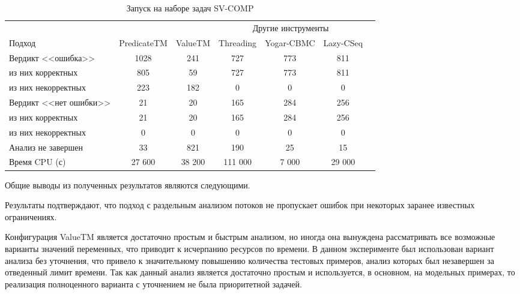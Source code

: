 \begin{center}
  \begin{table}[h]\footnotesize \centering
  	\label{table-sv-comp-tools}
    \caption{Запуск на наборе задач SV-COMP}
    \begin{tabular}{ | l | c | c | c | c | c | c |}
      \hline
      		& 		\multicolumn{2}{c|}{\theory} & \multicolumn{3}{c|}{Другие инструменты}  \\
      Подход         				& PredicateTM   & ValueTM 	& Threading & Yogar-CBMC 	& Lazy-CSeq  \\ \hline
      Вердикт <<ошибка>> 				& 1028    		& 241       & 727      	& 773       	& 811       \\ 
  \hspace{0.5cm} из них корректных 	& 805 			& 59 		& 727      	& 773       	& 811       \\ 
  \hspace{0.5cm} из них некорректных & 223 			& 182 		& 0    		& 0       		& 0          \\ \hline
      Вердикт <<нет ошибки>>  		& 21      		& 20        & 165       & 284        	& 256     \\ 
  \hspace{0.5cm} из них корректных 	& 21 			& 20    	& 165       & 284        	& 256       \\
  \hspace{0.5cm} из них некорректных & 0 			& 0    		& 0       	& 0         	& 0        \\ \hline
      Анализ не завершен       		& 33     		& 821       & 190      	& 25        	& 15      \\ \hline
      Время CPU (с)   				& 27 600 		& 38 200    & 111 000  	& 7 000    		& 29 000    \\ 
      \hline
    \end{tabular}
  \end{table}
\end{center}

Общие выводы из полученных результатов являются следующими.

Результаты подтверждают, что подход с раздельным анализом потоков не пропускает ошибок при некоторых заранее известных ограничениях.

Конфигурация ValueTM является достаточно простым и быстрым анализом, но иногда она вынуждена рассматривать все возможные варианты значений переменных, что приводит к исчерпанию ресурсов по времени.
В данном эксперименте был использован вариант анализа без уточнения, что привело к значительному повышению количества тестовых примеров, анализ которых был незавершен за отведенный лимит времени. 
Так как данный анализ является достаточно простым и используется, в основном, на модельных примерах, то реализация полноценного варианта с уточнением не была приоритетной задачей.

